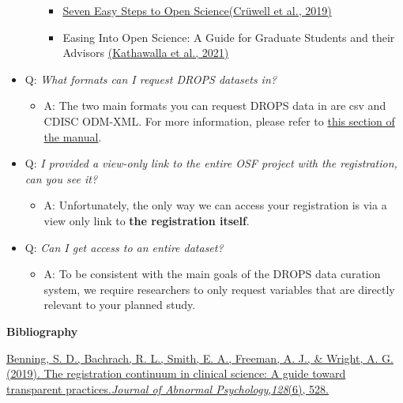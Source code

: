 \documentclass[
]{article}
\providecommand{\tightlist}{%
  \setlength{\itemsep}{0pt}\setlength{\parskip}{0pt}}
\begin{document}
\begin{itemize}
\begin{itemize}
    \begin{itemize}
    \tightlist
    \item
      \href{https://econtent.hogrefe.com/doi/full/10.1027/2151-2604/a000387}{Seven
      Easy Steps to Open
      Science}\href{https://www.zotero.org/google-docs/?t8Vk4A}{(Crüwell
      et al., 2019)}
    \item
      Easing Into Open Science: A Guide for Graduate Students and their
      Advisors
      \href{https://www.zotero.org/google-docs/?ho5j2d}{(Kathawalla et
      al., 2021)}
    \end{itemize}
  \end{itemize}
\item
  Q: \emph{What formats can I request DROPS datasets in?}

  \begin{itemize}
  \tightlist
  \item
    A: The two main formats you can request DROPS data in are csv and
    CDISC ODM-XML. For more information, please refer to
    \protect\hyperlink{_2dzt9xeysbee}{this section of the manual}.
  \end{itemize}
\item
  Q: \emph{I provided a view-only link to the entire OSF project with
  the registration, can you see it?}

  \begin{itemize}
  \tightlist
  \item
    A: Unfortunately, the only way we can access your registration is
    via a view only link to \textbf{the registration itself}.
  \end{itemize}
\item
  Q: \emph{Can I get access to an entire dataset?}

  \begin{itemize}
  \tightlist
  \item
    A: To be consistent with the main goals of the DROPS data curation
    system, we require researchers to only request variables that are
    directly relevant to your planned study.
  \end{itemize}
\end{itemize}

\textbf{Bibliography}

\href{https://www.zotero.org/google-docs/?EJLlNC}{Benning, S. D.,
Bachrach, R. L., Smith, E. A., Freeman, A. J., \& Wright, A. G. (2019).
The registration continuum in clinical science: A guide toward
transparent
practices.}\href{https://www.zotero.org/google-docs/?EJLlNC}{\emph{Journal
of Abnormal
Psychology}}\href{https://www.zotero.org/google-docs/?EJLlNC}{,}\href{https://www.zotero.org/google-docs/?EJLlNC}{\emph{128}}\href{https://www.zotero.org/google-docs/?EJLlNC}{(6),
528.}
\end{document}
